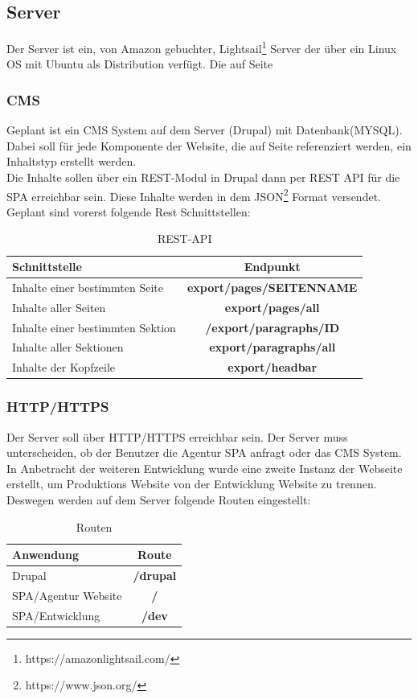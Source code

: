 \documentclass[11pt,a4paper]{article}
\begin{document}
\subsection{Server}
Der Server ist ein, von Amazon gebuchter, Lightsail\footnote{https://amazonlightsail.com/} Server der über ein Linux OS mit Ubuntu als Distribution verfügt. Die auf Seite %
\subsubsection{CMS}
Geplant ist ein CMS System auf dem Server (Drupal) mit Datenbank(MYSQL). Dabei soll für jede Komponente der Website, die auf Seite \pageref{sec:epage}
referenziert werden, ein Inhaltstyp erstellt werden.\\
Die Inhalte sollen über ein REST-Modul in Drupal dann per REST API für die SPA erreichbar sein.
Diese Inhalte  werden in dem JSON\footnote{https://www.json.org/} Format versendet. 
Geplant sind vorerst folgende Rest Schnittstellen:
\begin{table}[!ht]
  \centering
     \begin{tabular}{l|c}
       \textbf{Schnittstelle}  & \textbf{Endpunkt} \\
       \hline
       Inhalte einer bestimmten Seite & \textbf{export/pages/SEITENNAME} \\
       Inhalte aller Seiten & \textbf{export/pages/all} \\
       Inhalte einer bestimmten Sektion & \textbf{/export/paragraphs/ID} \\
       Inhalte aller Sektionen & \textbf{export/paragraphs/all}\\
       Inhalte der Kopfzeile & \textbf{export/headbar}\\
     \end{tabular}
\caption{REST-API}
\end{table}
\subsubsection{HTTP/HTTPS}
Der Server soll über HTTP/HTTPS erreichbar sein. Der Server muss unterscheiden, ob der Benutzer die Agentur SPA anfragt oder das CMS System. In Anbetracht der weiteren Entwicklung wurde eine zweite Instanz der Webseite erstellt, um Produktions Website von der Entwicklung Website zu trennen. Deswegen werden auf dem Server folgende Routen eingestellt:
\begin{table}[!ht]
  \centering
     \begin{tabular}{l|c}
       \textbf{Anwendung}  & \textbf{Route} \\
       \hline
       Drupal & \textbf{/drupal}\\
       SPA/Agentur Website & \textbf{/}\\
       SPA/Entwicklung & \textbf{/dev}\\ 
     \end{tabular}
\caption{Routen}
\end{table}
\end{document}
